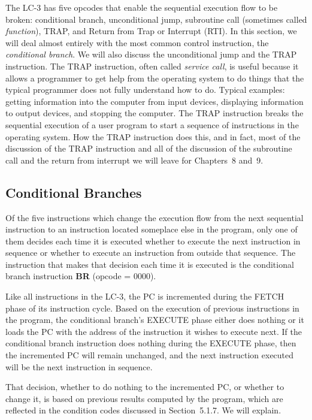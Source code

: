 \documentclass{patt}
\begin{document}
The LC-3 has five opcodes that enable the sequential execution flow to be 
broken: conditional branch, unconditional jump, subroutine call (sometimes 
called {\em function}), TRAP, and Return from Trap or Interrupt (RTI). In this 
section, we will deal almost entirely with the most common control instruction,
the {\em conditional branch}. We will also discuss the unconditional jump and
the TRAP instruction. The TRAP instruction, often called {\em service call},
is useful because it allows a programmer to get help from the operating system 
to do things that the typical programmer does not fully understand how to do. 
Typical examples: getting information into the computer from
input devices, displaying information to output devices, and stopping
the computer.  The TRAP instruction breaks the sequential execution of a user
program to start a sequence of instructions in the operating system.  How the
TRAP instruction does this, and in fact, most of the discussion of the TRAP 
instruction and all of the discussion of the subroutine call and the return 
from interrupt we will leave for Chapters~8 and~9.

\subsection{Conditional Branches}

Of the five instructions which change the execution flow from the next 
sequential instruction to an instruction located someplace else in the 
program, only one of 
them decides each time it is executed whether to execute the next instruction in
sequence or whether to execute an instruction from outside that sequence.  
The instruction that makes that decision each time it is executed is the 
conditional branch instruction {\bf BR} (opcode = 0000). 

Like all instructions in the LC-3, the PC is incremented during the FETCH phase
of its instruction cycle.  Based on the execution of previous instructions in
the program, the conditional branch's EXECUTE phase either does nothing or it
loads the PC with the address of the instruction it wishes to execute next.
If the conditional branch instruction does nothing during the EXECUTE phase,
then the incremented PC will remain unchanged, and the next instruction 
executed will be the next instruction in sequence.

That decision, whether to do nothing to the incremented PC, or whether to 
change it, is based on previous results computed by the program, which are
reflected in the condition codes discussed in Section~5.1.7.  We will explain.
\end{document}
